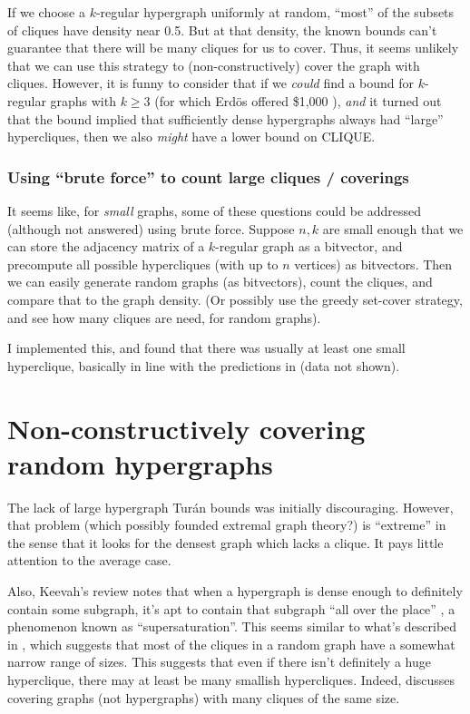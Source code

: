 \documentclass[12pt]{article}
\theoremstyle{definition}
\begin{document}
If we choose a $k$-regular hypergraph uniformly at random,
``most'' of the subsets of cliques have density near 0.5. But at that density,
the known
bounds can't guarantee that there will be many cliques for us to cover.
Thus, it seems unlikely that
we can use this strategy to (non-constructively) cover the graph with
cliques. However, it is funny to consider that if we {\em could} find a
bound for $k$-regular graphs with $k \ge 3$
(for which Erd\"os offered \$1,000 \cite{keevash2011hypergraph}),
{\em and} it turned
out that the bound implied that sufficiently dense hypergraphs always had
``large'' hypercliques, then we also {\em might} have a
lower bound on CLIQUE.

\subsubsection{Using ``brute force'' to count large cliques / coverings}

It seems like, for {\em small} graphs, some of these questions could be
addressed (although not answered)
 using brute force. Suppose $n, k$ are small enough that we can 
store the adjacency matrix of a $k$-regular graph as a bitvector, and precompute
all possible hypercliques
(with up to $n$ vertices) as bitvectors. Then we can easily generate
random graphs (as bitvectors), count the cliques, and compare that to the graph
density. (Or possibly use the greedy set-cover strategy, and see how
many cliques are need, for random graphs).

I implemented this, and found that there was usually at least one small
hyperclique, basically in line with the predictions in \cite{bollobas1976cliques}
(data not shown).

\section{Non-constructively covering random hypergraphs}

The lack of large hypergraph Tur\'an bounds was initially discouraging.
However, that problem (which possibly founded extremal graph theory?) is
``extreme'' in the sense that it looks for the densest graph which lacks
a clique. It pays little attention to the average case.

Also, Keevah's review notes that when a hypergraph is dense enough to
definitely contain some subgraph, it's apt to contain that subgraph
``all over the place'' \cite{keevash2011hypergraph}, a phenomenon
known as ``supersaturation''.  This seems similar to what's
described in \cite{bollobas1976cliques}, which suggests that most of
the cliques in a random graph have a somewhat narrow range of sizes.
This suggests that even if there isn't definitely a huge hyperclique,
there may at least be many smallish hypercliques.
Indeed, \cite{bollobas1993clique} discusses covering graphs (not hypergraphs)
with many cliques of the same size.
\end{document}
